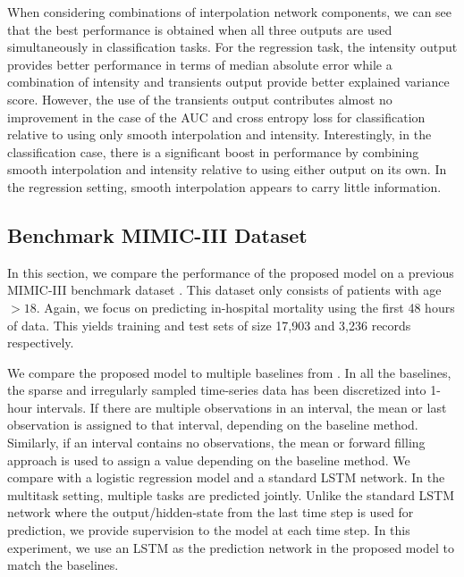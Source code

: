 \documentclass{article} \usepackage{iclr2019_conference,times}
\begin{document}
When considering combinations of interpolation network components, we can
see that the best performance is obtained when all three outputs are
used simultaneously in classification tasks.  For the regression task, the 
intensity output provides better performance in terms of median absolute 
error while a combination of intensity and transients output provide better explained variance score.
However, the use of the transients output contributes almost
no improvement in the case of the AUC and cross entropy loss for classification
relative to using only smooth interpolation and intensity. Interestingly,
in the classification case, there is a significant boost in performance 
by combining smooth interpolation and intensity relative to using either 
output on its own. In the regression setting, smooth interpolation appears
to carry little information. 

\subsection{Benchmark MIMIC-III Dataset}
\label{benchmark}
In this section, we compare the performance of the proposed model on a previous MIMIC-III benchmark dataset \citep{benchmark}. This dataset only consists of patients with age $> 18$. Again, we focus on predicting in-hospital mortality using the first 48 hours of data. This yields training and test sets of size 17,903 and 3,236 records respectively. 

We compare the proposed model to multiple baselines from \cite{benchmark}. In all the baselines, the sparse and irregularly sampled time-series data has been discretized into 1-hour intervals. If there are multiple observations in an interval, the mean or last observation is assigned to that interval, depending on the baseline  method. Similarly, if an interval contains no observations, the  mean or forward filling approach is used to assign a value depending on the baseline method. We compare with a logistic regression model and a standard LSTM network. In the multitask setting, multiple tasks are predicted jointly. Unlike the standard LSTM network where the output/hidden-state from the last time step is used for prediction, we provide supervision to the model at each time step. In this experiment, we use an LSTM as the prediction network in the proposed model to match the baselines. 
\end{document}
